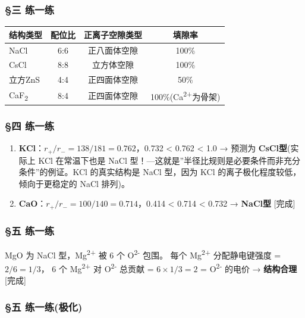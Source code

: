 \subsubsection{§三 练一练}\label{ux4e09-ux7ec3ux4e00ux7ec3}

{\def\LTcaptype{none} %
\begin{longtable}[]{@{}lccc@{}}
\toprule\noalign{}
结构类型 & 配位比 & 正离子空隙类型 & 填隙率 \\
\midrule\noalign{}
\endhead
\bottomrule\noalign{}
\endlastfoot
NaCl & 6:6 & 正八面体空隙 & 100\% \\
CsCl & 8:8 & 立方体空隙 & 100\% \\
立方ZnS & 4:4 & 正四面体空隙 & 50\% \\
CaF\textsubscript{2} & 8:4 & 正四面体空隙 & 100\%(Ca\textsuperscript{2+}为骨架) \\
\end{longtable}
}

\subsubsection{§四 练一练}\label{ux56db-ux7ec3ux4e00ux7ec3}

\begin{enumerate}
\def\labelenumi{(\arabic{enumi})}
\item
  \textbf{KCl}：\(r_+/r_- = 138/181 = 0.762\)，0.732 \textless{} 0.762 \textless{} 1.0 → 预测为 \textbf{CsCl型}(实际上 KCl 在常温下也是 NaCl 型！---这就是''半径比规则是必要条件而非充分条件''的例证。KCl 的真实结构是 NaCl 型，因为 KCl 的离子极化程度较低，倾向于更稳定的 NaCl 排列)。
\item
  \textbf{CaO}：\(r_+/r_- = 100/140 = 0.714\)，0.414 \textless{} 0.714 \textless{} 0.732 → \textbf{NaCl型} {[}完成{]}
\end{enumerate}

\subsubsection{§五 练一练}\label{ux4e94-ux7ec3ux4e00ux7ec3}

MgO 为 NaCl 型，Mg\textsuperscript{2+} 被 6 个 O\textsuperscript{2-} 包围。
每个 Mg\textsuperscript{2+} 分配静电键强度 = \(2/6 = 1/3\)，
6 个 Mg\textsuperscript{2+} 对 O\textsuperscript{2-} 总贡献 = \(6 \times 1/3 = 2\) = O\textsuperscript{2-} 的电价 → \textbf{结构合理} {[}完成{]}

\subsubsection{§五 练一练(极化)}\label{ux4e94-ux7ec3ux4e00ux7ec3ux6781ux5316}

